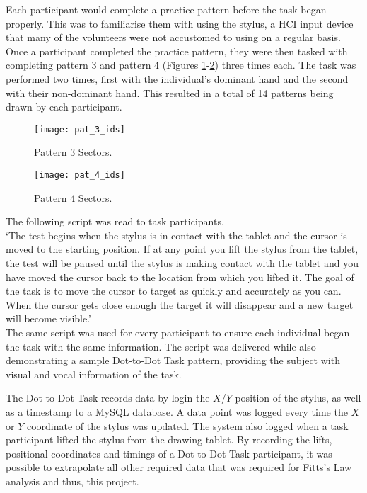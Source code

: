 		Each participant would complete a practice pattern before the task began properly. This was to familiarise them with using the stylus, a HCI input device that many of the volunteers were not accustomed to using on a regular basis. Once a participant completed the practice pattern, they were then tasked with completing pattern 3 and pattern 4 (Figures \ref{fig_pat_3_ids}-\ref{fig_pat_4_ids}) three times each. The task was performed two times, first with the individual's dominant hand and the second with their non-dominant hand. This resulted in a total of 14 patterns being drawn by each participant.
		
		\begin{figure}[]
			\centering
			\texttt{[image: pat\_3\_ids]}
			\caption{Pattern 3 Sectors.}
			\label{fig_pat_3_ids}
		\end{figure}

		\begin{figure}[]
			\centering
			\texttt{[image: pat\_4\_ids]}
			\caption{Pattern 4 Sectors.}
			\label{fig_pat_4_ids}
		\end{figure}		
		The following script was read to task participants,\\
	
		‘The test begins when the stylus is in contact with the tablet and the cursor is moved to the starting position. If at any point you lift the stylus from the tablet, the test will be paused until the stylus is making contact with the tablet and you have moved the cursor back to the location from which you lifted it. The goal of the task is to move the cursor to target as quickly and accurately as you can. When the cursor gets close enough the target it will disappear and a new target will become visible.’\\
	
		The same script was used for every participant to ensure each individual began the task with the same information. The script was delivered while also demonstrating a sample Dot-to-Dot Task pattern, providing the subject with visual and vocal information of the task. 
	
		The Dot-to-Dot Task records data by login the \(X\)/\(Y\) position of the stylus, as well as a timestamp to a MySQL database. A data point was logged every time the \(X\) or \(Y\) coordinate of the stylus was updated. The system also logged when a task participant lifted the stylus from the drawing tablet. By recording the lifts, positional coordinates and timings of a Dot-to-Dot Task participant, it was possible to extrapolate all other required data that was required for Fitts’s Law analysis and thus, this project.
	
